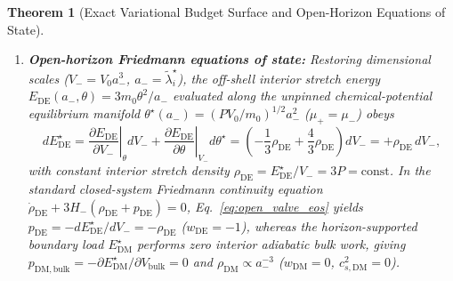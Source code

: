 \documentclass[pdflatex,sn-mathphys-num]{sn-jnl}
\theoremstyle{thmstyleone}
\newtheorem{theorem}{Theorem}
\theoremstyle{thmstyletwo}
\theoremstyle{thmstylethree}
\begin{document}
\begin{theorem}[Exact Variational Budget Surface and Open-Horizon Equations of State]
\begin{enumerate}
\item \textbf{Open-horizon Friedmann equations of state:} Restoring dimensional scales ($V_- = V_0 a_-^3$, $a_- = \tilde{\lambda}_i^\star$), the off-shell interior stretch energy $E_{\mathrm{DE}}(a_-,\theta) = 3m_0\theta^2/a_-$ evaluated along the unpinned chemical-potential equilibrium manifold $\theta^\star(a_-) = (PV_0/m_0)^{1/2}a_-^2$ ($\mu_+ = \mu_-$) obeys
\begin{equation}\label{eq:open_valve_eos}
dE_{\mathrm{DE}}^\star = \left.\frac{\partial E_{\mathrm{DE}}}{\partial V_-}\right|_\theta dV_- + \left.\frac{\partial E_{\mathrm{DE}}}{\partial\theta}\right|_{V_-} d\theta^\star = \left(-\frac{1}{3}\rho_{\mathrm{DE}} + \frac{4}{3}\rho_{\mathrm{DE}}\right)dV_- = +\rho_{\mathrm{DE}}\,dV_-,
\end{equation}
with constant interior stretch density $\rho_{\mathrm{DE}} = E_{\mathrm{DE}}^\star / V_- = 3P = \mathrm{const}$. In the standard closed-system Friedmann continuity equation $\dot{\rho}_{\mathrm{DE}} + 3H_-(\rho_{\mathrm{DE}} + p_{\mathrm{DE}}) = 0$, Eq.~\eqref{eq:open_valve_eos} yields $p_{\mathrm{DE}} = -dE_{\mathrm{DE}}^\star / dV_- = -\rho_{\mathrm{DE}}$ ($w_{\mathrm{DE}} = -1$), whereas the horizon-supported boundary load $E_{\mathrm{DM}}^\star$ performs zero interior adiabatic bulk work, giving $p_{\mathrm{DM,bulk}} = -\partial E_{\mathrm{DM}}^\star / \partial V_{\mathrm{bulk}} = 0$ and $\rho_{\mathrm{DM}} \propto a_-^{-3}$ ($w_{\mathrm{DM}} = 0$, $c_{s,\mathrm{DM}}^2 = 0$).
\end{enumerate}
\end{theorem}
\end{document}
